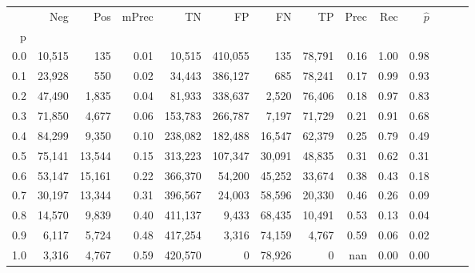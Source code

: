 \begin{tabular}{rrrrrrrrrrrrrr}
\toprule
{} &     Neg &     Pos & mPrec &       TN &       FP &      FN &      TP &  Prec &   Rec & $\hat{p}$ \\
p   &         &         &       &          &          &         &         &       &       &           \\
\midrule
0.0 &  10,515 &     135 &  0.01 &   10,515 &  410,055 &     135 &  78,791 &  0.16 &  1.00 &      0.98 \\
0.1 &  23,928 &     550 &  0.02 &   34,443 &  386,127 &     685 &  78,241 &  0.17 &  0.99 &      0.93 \\
0.2 &  47,490 &   1,835 &  0.04 &   81,933 &  338,637 &   2,520 &  76,406 &  0.18 &  0.97 &      0.83 \\
0.3 &  71,850 &   4,677 &  0.06 &  153,783 &  266,787 &   7,197 &  71,729 &  0.21 &  0.91 &      0.68 \\
0.4 &  84,299 &   9,350 &  0.10 &  238,082 &  182,488 &  16,547 &  62,379 &  0.25 &  0.79 &      0.49 \\
0.5 &  75,141 &  13,544 &  0.15 &  313,223 &  107,347 &  30,091 &  48,835 &  0.31 &  0.62 &      0.31 \\
0.6 &  53,147 &  15,161 &  0.22 &  366,370 &   54,200 &  45,252 &  33,674 &  0.38 &  0.43 &      0.18 \\
0.7 &  30,197 &  13,344 &  0.31 &  396,567 &   24,003 &  58,596 &  20,330 &  0.46 &  0.26 &      0.09 \\
0.8 &  14,570 &   9,839 &  0.40 &  411,137 &    9,433 &  68,435 &  10,491 &  0.53 &  0.13 &      0.04 \\
0.9 &   6,117 &   5,724 &  0.48 &  417,254 &    3,316 &  74,159 &   4,767 &  0.59 &  0.06 &      0.02 \\
1.0 &   3,316 &   4,767 &  0.59 &  420,570 &        0 &  78,926 &       0 &   nan &  0.00 &      0.00 \\
\bottomrule
\end{tabular}
